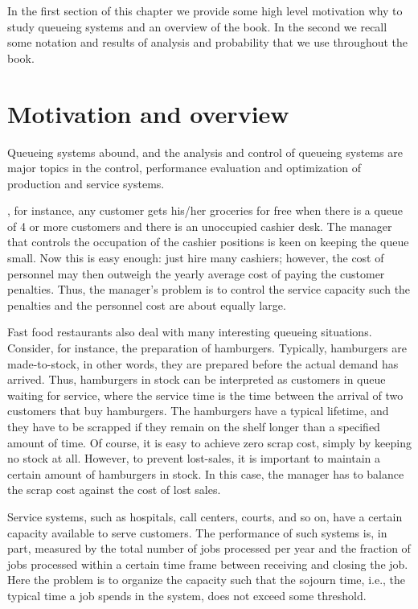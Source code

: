 \documentclass[queueing_book]{subfiles}
\begin{document}
In the first section of this chapter we provide some high level motivation why to study queueing systems and an overview of the book. In the second we recall some notation and results of analysis and probability that we use throughout the book.

\section{Motivation and overview}
\label{sec:motivation-overview}

Queueing systems abound, and the analysis and control of queueing systems are major topics in the control, performance evaluation and optimization of production and service systems.


, for instance, any customer gets his/her groceries for free when there is a queue of 4 or more customers and there is an unoccupied cashier desk.
The manager that controls the occupation of the cashier positions is keen on keeping the queue small.
Now this is easy enough: just hire many cashiers; however, the cost of personnel may then outweigh the yearly average cost of paying the customer penalties.
Thus, the manager's problem is to control the service capacity such the penalties and the personnel cost are about equally large.

Fast food restaurants also deal with many interesting queueing situations.
Consider, for instance, the preparation of hamburgers.
Typically, hamburgers are made-to-stock, in other words, they are prepared before the actual demand has arrived.
Thus, hamburgers in stock can be interpreted as customers in queue waiting for service, where the service time is the time between the arrival of two customers that buy hamburgers.
The hamburgers have a typical lifetime, and they have to be scrapped if they remain on the shelf longer than a specified amount of time.
Of course, it is easy to achieve zero scrap cost, simply by keeping no stock at all.
However, to prevent lost-sales, it is important to maintain a certain amount of hamburgers in stock.
In this case, the manager has to balance the scrap cost against the cost of lost sales.

Service systems, such as hospitals, call centers, courts, and so on, have a certain capacity available to serve customers.
The performance of such systems is, in part, measured by the total number of jobs processed per year and the fraction of jobs processed within a certain time frame between receiving and closing the job.
Here the problem is to organize the capacity such that the sojourn time, i.e., the typical time a job spends in the system, does not exceed some threshold.
\end{document}

